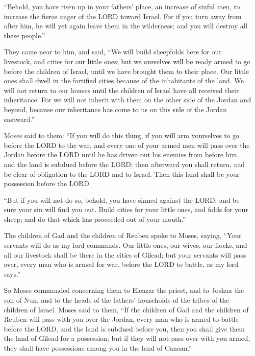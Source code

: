 \myverse{}“Behold, you have risen up in your fathers’ place, an increase
of sinful men, to increase the fierce anger of the LORD toward Israel.
\myverse{}For if you turn away from after him, he will yet again leave them in the
wilderness; and you will destroy all these people.”


\myverse{}They came near to him, and said, “We will build sheepfolds here
for our livestock, and cities for our little ones;
\myverse{}but we ourselves will be ready armed to go before the children of Israel,
until we have brought them to their place. Our little ones shall dwell in the fortified cities because
of the inhabitants of the land.
\myverse{}We will not return to our houses until the children of Israel have all received
their inheritance.
\myverse{}For we will not inherit with them on the other side of the Jordan and beyond,
because our inheritance has come to us on this side of the Jordan eastward.”


\myverse{}Moses said to them: “If you will do this thing, if you will
arm yourselves to go before the LORD to the war,
\myverse{}and every one of your armed men will pass over the Jordan before the LORD
until he has driven out his enemies from before him,
\myverse{}and the land is subdued before the LORD; then afterward you shall return,
and be clear of obligation to the LORD and to Israel. Then this land shall be your possession before the
LORD.


\myverse{}“But if you will not do so, behold, you have sinned against
the LORD; and be sure your sin will find you out.
\myverse{}Build cities for your little ones, and folds for your sheep; and do that
which has proceeded out of your mouth.”


\myverse{}The children of Gad and the children of Reuben spoke to Moses,
saying, “Your servants will do as my lord commands.
\myverse{}Our little ones, our wives, our flocks, and all our livestock shall be there
in the cities of Gilead;
\myverse{}but your servants will pass over, every man who is armed for war, before
the LORD to battle, as my lord says.”


\myverse{}So Moses commanded concerning them to Eleazar the priest, and
to Joshua the son of Nun, and to the heads of the fathers’ households of the tribes of the children of
Israel.
\myverse{}Moses said to them, “If the children of Gad and the children of Reuben will
pass with you over the Jordan, every man who is armed to battle before the LORD, and the land is subdued
before you, then you shall give them the land of Gilead for a possession;
\myverse{}but if they will not pass over with you armed, they shall have possessions
among you in the land of Canaan.”


